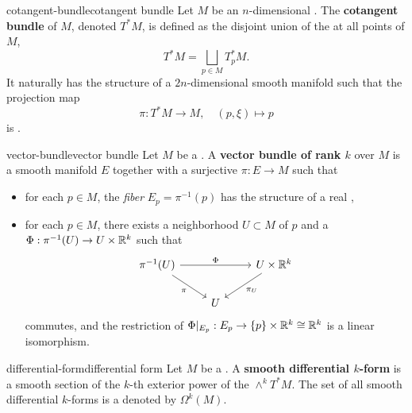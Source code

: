 \begin{topic}{cotangent-bundle}{cotangent bundle}
    Let $M$ be an $n$-dimensional . The \textbf{cotangent bundle} of $M$, denoted $T^*M$, is defined as the disjoint union of the  at all points of $M$,
    \[ T^*M = \bigsqcup_{p \in M} T^*_p M . \]
    It naturally has the structure of a $2n$-dimensional smooth manifold such that the projection map
    \[ \pi : T^*M \to M, \quad (p, \xi) \mapsto p \]
    is .
\end{topic}

\begin{topic}{vector-bundle}{vector bundle}
    Let $M$ be a . A \textbf{vector bundle of rank $k$} over $M$ is a smooth manifold $E$ together with a surjective  $\pi : E \to M$ such that
    \begin{itemize}
        \item for each $p \in M$, the \textit{fiber} $E_p = \pi^{-1}(p)$ has the structure of a real ,
        \item for each $p \in M$, there exists a neighborhood $U \subset M$ of $p$ and a  $\Phi : \pi^{-1}(U) \to U \times \mathbb{R}^k$ such that
        \[ \begin{tikzcd} \pi^{-1}(U) \arrow{rr}{\Phi} \arrow[swap]{dr}{\pi} && U \times \RR^k \arrow{dl}{\pi_U} \\ & U & \end{tikzcd} \]
        commutes, and the restriction of $\Phi|_{E_p} : E_p \to \{ p \} \times \mathbb{R}^k \cong \mathbb{R}^k$ is a linear isomorphism.
    \end{itemize}
\end{topic}

\begin{topic}{differential-form}{differential form}
    Let $M$ be a . A \textbf{smooth differential $k$-form} is a smooth section of the $k$-th exterior power of the  $\wedge^k T^* M$. The set of all smooth differential $k$-forms is a  denoted by $\Omega^k(M)$.
\end{topic}

